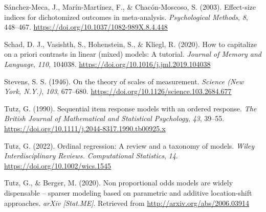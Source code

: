 \documentclass[
  man,floatsintext]{apa6}
\newlength{\cslhangindent}
\newenvironment{CSLReferences}[2] %
 {\begin{list}{}{%
  \setlength{\itemindent}{0pt}
  \setlength{\leftmargin}{0pt}
  \setlength{\parsep}{0pt}
  \ifodd #1
   \setlength{\leftmargin}{\cslhangindent}
   \setlength{\itemindent}{-1\cslhangindent}
  \fi
  \setlength{\itemsep}{#2\baselineskip}}}
 {\end{list}}
\begin{document}
\begin{CSLReferences}{1}{0}
Sánchez-Meca, J., Marín-Martínez, F., \& Chacón-Moscoso, S. (2003). Effect-size indices for dichotomized outcomes in meta-analysis. \emph{Psychological Methods}, \emph{8}, 448--467. \url{https://doi.org/10.1037/1082-989X.8.4.448}

Schad, D. J., Vasishth, S., Hohenstein, S., \& Kliegl, R. (2020). How to capitalize on a priori contrasts in linear (mixed) models: A tutorial. \emph{Journal of Memory and Language}, \emph{110}, 104038. \url{https://doi.org/10.1016/j.jml.2019.104038}

Stevens, S. S. (1946). On the theory of scales of measurement. \emph{Science (New York, N.Y.)}, \emph{103}, 677--680. \url{https://doi.org/10.1126/science.103.2684.677}

Tutz, G. (1990). Sequential item response models with an ordered response. \emph{The British Journal of Mathematical and Statistical Psychology}, \emph{43}, 39--55. \url{https://doi.org/10.1111/j.2044-8317.1990.tb00925.x}

Tutz, G. (2022). Ordinal regression: A review and a taxonomy of models. \emph{Wiley Interdisciplinary Reviews. Computational Statistics}, \emph{14}. \url{https://doi.org/10.1002/wics.1545}

Tutz, G., \& Berger, M. (2020). Non proportional odds models are widely dispensable -- sparser modeling based on parametric and additive location-shift approaches. \emph{arXiv {[}Stat.ME{]}}. Retrieved from \url{http://arxiv.org/abs/2006.03914}

\end{CSLReferences}
\end{document}
